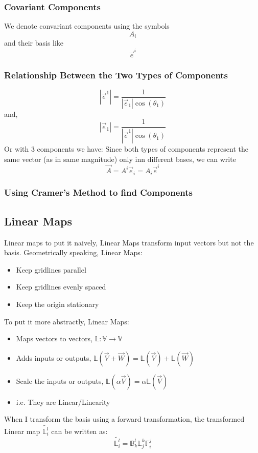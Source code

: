\subsubsection{Covariant Components}
We denote convariant components using the symbols
$$A_i$$
and their basis like
$${\overrightarrow{e}}^i$$
\subsubsection{Relationship Between the Two Types of Components}

$$|\overrightarrow{e}^1| = \frac{1}{|\overrightarrow{e}_1|\cos(\theta_1)}$$
and,
$$|\overrightarrow{e}_1| = \frac{1}{|\overrightarrow{e}^1|\cos(\theta_1)}$$
Or with 3 components we have:
Since both types of components represent the same vector (as in same magnitude) only inn  different bases, we can write
$$\overrightarrow{A} = A^{i}\overrightarrow{e}_i = A_{i}\overrightarrow{e}^i$$
\subsubsection{Using Cramer's Method to find Components}
\subsection{Linear Maps}
Linear maps to put it naively, Linear Maps transform input vectors but not the basis. Geometrically speaking, Linear Maps:
\begin{itemize}
	\item Keep gridlines parallel
	\item Keep gridlines evenly spaced
	\item Keep the origin stationary
\end{itemize}
To put it more abstractly, Linear Maps:
\begin{itemize}
	\item Maps vectors to vectors, $\mathbb{L}: \mathbb{V} \rightarrow \mathbb{V}$
	\item Adds inputs or outputs, $\mathbb{L}(\vec{V} + \vec{W}) = \mathbb{L}(\vec{V}) + \mathbb{L}(\vec{W})$
	\item Scale the inputs or outputs, $\mathbb{L}(\alpha \vec{V}) = \alpha \mathbb{L}(\vec{V})$
	\item i.e. They are Linear/Linearity
\end{itemize}
When I transform the basis using a forward transformation, the transformed Linear map $\tilde{\mathbb{L}^{l}_{i}}$ can be written as:
\begin{equation}
	\tilde{\mathbb{L}^{l}_{i}} = \mathbb{B}^{l}_{k} \mathbb{L}^{k}_{j} \mathbb{F}^{j}_{i}
\end{equation}

